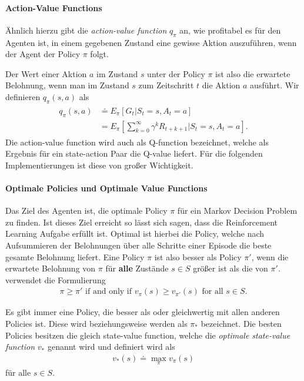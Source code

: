 \paragraph{Action-Value Functions}
Ähnlich hierzu gibt die \textit{action-value function} $ q_\pi $ an, wie profitabel es für den Agenten ist, in einem gegebenen Zustand eine gewisse Aktion auszuführen, wenn der Agent der Policy $ \pi $ folgt.

Der Wert einer Aktion $ a $ im Zustand $ s $ unter der Policy $ \pi $ ist also die erwartete Belohnung, wenn man im Zustand $ s $ zum Zeitschritt $ t $ die Aktion $ a $ ausführt. Wir definieren $ q_\pi(s, a) $ als
\begin{align}
    \begin{split}
    q_\pi(s,a) & \doteq E_\pi \left[G_t | S_t = s, A_t = a \right]\\
    & = E_\pi \left[\sum_{k = 0}^{\infty} \gamma^k R_{t + k + 1} | S_t = s, A_t = a \right].
    \end{split}
\end{align}
Die action-value function wird auch als Q-function bezeichnet, welche als Ergebnis für ein state-action Paar die Q-value liefert. Für die folgenden Implementierungen ist diese von großer Wichtigkeit.

\paragraph{Optimale Policies und Optimale Value Functions}
Das Ziel des Agenten ist, die optimale Policy $ \pi $ für ein Markov Decision Problem zu finden. Ist dieses Ziel erreicht so lässt sich sagen, dass die Reinforcement Learning Aufgabe erfüllt ist. Optimal ist hierbei die Policy, welche nach Aufsummieren der Belohnungen über alle Schritte einer Episode die beste gesamte Belohnung liefert. Eine Policy $ \pi $ ist also besser als Policy $ \pi' $, wenn die erwartete Belohnung von $ \pi $ für \textbf{alle} Zustände $ s \in S $ größer ist als die von $ \pi' $. \cite{06_sutton2018reinforcement} verwendet die Formulierung
\begin{align}
    \pi \geq \pi' \text{ if and only if } v_\pi(s) \geq v_{\pi'}(s) \text{ for all } s \in S.
\end{align}

Es gibt immer eine Policy, die besser als oder gleichwertig mit allen anderen Policies ist. Diese wird beziehungsweise werden als $ \pi_* $ bezeichnet. Die besten Policies besitzen die gleich state-value function, welche die \textit{optimale state-value function} $ v_* $ genannt wird und definiert wird als
\begin{align}
    v_*(s) \doteq \max_\pi v_\pi(s)
\end{align}
für alle $ s \in S $.


